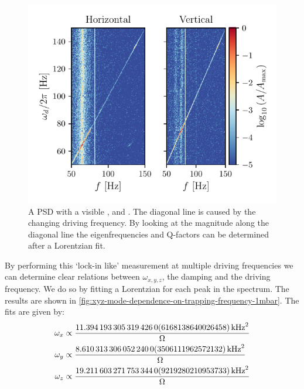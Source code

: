 \begin{figure}
    \centering
    \includegraphics{figures/data/xyz_mode_spectrum.pdf}
    \caption{A PSD with a visible \xmode, \ymode and \zmode. The diagonal line is caused by the changing driving frequency. By looking at the magnitude along the diagonal line the eigenfrequencies and Q-factors can be determined after a Lorentzian fit.}
    \label{fig:xyz-mode-spectrum-1mbar}
\end{figure}

By performing this `lock-in like' measurement at multiple driving frequencies we can determine clear relations between $\omega_{x,y,z}$, the damping and the driving frequency. We do so by fitting a Lorentzian for each peak in the spectrum. The results are shown in \autoref{fig:xyz-mode-dependence-on-trapping-frequency-1mbar}. The fits are given by:
\begin{align*}
    \omega_x &\propto \frac{\qty{ 11.394193305319426 \pm 0.6168138640026458 }{\square\kilo\hertz}}{\Omega} \\ %
    \omega_y &\propto \frac{\qty{ 8.61031330605224 \pm 0.3506111962572132 }{\square\kilo\hertz}}{\Omega} \\ %
    \omega_z &\propto \frac{\qty{ 19.211603271753344 \pm 0.9219280210953733 }{\square\kilo\hertz}}{\Omega} %
\end{align*}

